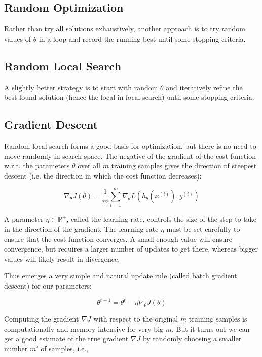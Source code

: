 \subsection{Random Optimization}

Rather than try all solutions exhaustively, another approach is to try random values of $\theta$ in a loop and record the running best until some stopping criteria.

\subsection{Random Local Search}

A slightly better strategy is to start with random $\theta$ and iteratively refine the best-found solution (hence the local in local search) until some stopping criteria.

\subsection{Gradient Descent}

Random local search forms a good basis for optimization, but there is no need to move randomly in search-space. The negative of the gradient of the cost function w.r.t. the parameters $\theta$ over all $m$ training samples gives the direction of steepest descent (i.e. the direction in which the cost function decreases):

$$
\nabla_{\theta} J(\theta) = \frac{1}{m} \sum_{i=1}^{m} \nabla_{\theta} L(h_{\theta}(x^{(i)}), y^{(i)})
$$

A parameter $\eta \in \mathbb{{R}^{+}}$, called the learning rate, controls the size of the step to take in the direction of the gradient.
The learning rate $\eta$ must be set carefully to ensure that the cost function converges. A small enough value will ensure convergence, but requires a larger number of updates to get there, whereas bigger values will likely result in divergence.

Thus emerges a very simple and natural update rule (called batch gradient descent) for our parameters:

$$
\theta^{t+1} = \theta^t - \eta \nabla_{\theta} J(\theta)
$$

Computing the gradient $\nabla J$ with respect to the original $m$ training samples is computationally and memory intensive for very big $m$. But it turns out we can get a good estimate of the true gradient $\nabla J$ by randomly choosing a smaller number $m'$ of samples, i.e.,


